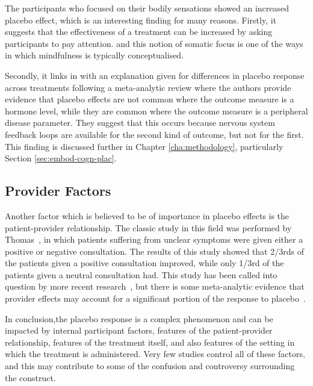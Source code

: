 The participants who focused on their bodily sensations showed an increased placebo effect, which is an interesting finding for many reasons. Firstly, it suggests that the effectiveness of a treatment can be increased by asking participants to pay attention.%
and this notion of somatic focus is one of the ways in which mindfulness is typically conceptualised. 

Secondly, it links in with an explanation given for differences in placebo response across treatments following a meta-analytic review \cite{Meissner2007} where the authors provide evidence that placebo effects are not common where the outcome measure is a hormone level, while they are common where the outcome measure is a peripheral disease parameter. They suggest that this occurs because nervous system feedback loops are available for the second kind of outcome, but not for the first. This finding is discussed further in Chapter \ref{cha:methodology}, particularly Section \ref{sec:embod-cogn-plac}. 

\subsection{Provider Factors}

Another factor which is believed to be of importance in placebo effects is the patient-provider relationship. The classic study in this field was performed by Thomas~\cite{Thomas1994}, in which  patients suffering from unclear symptoms were given either a positive or negative consultation.  The results of this study showed that 2/3rds of the patients given a positive consultation improved, while only 1/3rd of the patients given a neutral consultation had. This study has been called into question by more recent research~\cite{Knipschild2005}, but there is some meta-analytic evidence that provider effects may account for a significant portion of the response to placebo~\cite{DiBlasi2001}.



In conclusion,the placebo response is a complex phenomenon and can be impacted by internal  participant factors, features of the patient-provider relationship, features of the treatment itself, and also features of the setting in which the treatment is administered. Very few studies control all of these factors, and this may contribute to some of the confusion and controversy surrounding the construct. 

